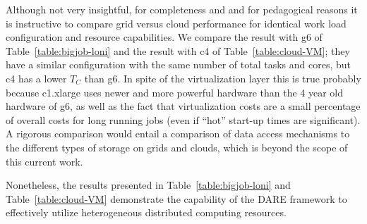 \documentclass{sig-alternate}
\begin{document}
Although not very insightful, for completeness and and for pedagogical
reasons it is instructive to compare grid versus cloud performance for
identical work load configuration and resource capabilities.  We
compare the result with g6 of Table~\ref{table:bigjob-loni} and the
result with c4 of Table~\ref{table:cloud-VM}; they have a similar
configuration with the same number of total tasks and cores, but c4
has a lower $T_C$ than g6. In spite of the virtualization layer this
is true probably because c1.xlarge uses newer and more powerful
hardware than the 4 year old hardware of g6, as well as the fact that
virtualization costs are a small percentage of overall costs for long
running jobs (even if ``hot'' start-up times are significant).  A
rigorous comparison would entail a comparison of data access
mechanisms to the different types of storage on grids and clouds,
which is beyond the scope of this current work.

Nonetheless, the results presented in Table~\ref{table:bigjob-loni}
and Table~\ref{table:cloud-VM} demonstrate the capability of the DARE
framework to effectively utilize heterogeneous distributed computing
resources.





\end{document}

